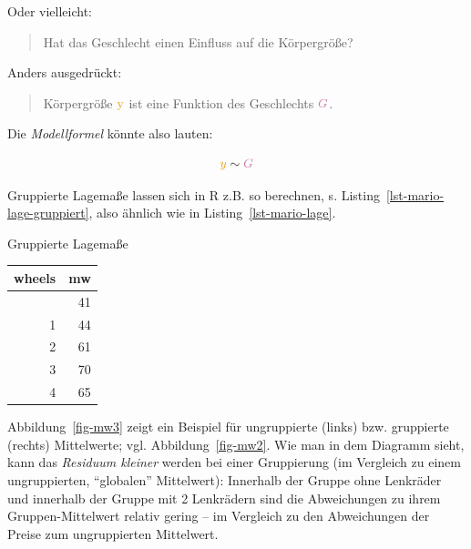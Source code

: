 \documentclass[
  letterpaper,
]{scrbook}
\newenvironment{Shaded}{\begin{snugshade}}{\end{snugshade}}
\newcommand{\AttributeTok}[1]{\textcolor[rgb]{0.40,0.45,0.13}{#1}}
\newcommand{\CommentTok}[1]{\textcolor[rgb]{0.37,0.37,0.37}{#1}}
\newcommand{\FunctionTok}[1]{\textcolor[rgb]{0.28,0.35,0.67}{#1}}
\newcommand{\NormalTok}[1]{\textcolor[rgb]{0.00,0.23,0.31}{#1}}
\newcommand{\OtherTok}[1]{\textcolor[rgb]{0.00,0.23,0.31}{#1}}
\newcommand{\SpecialCharTok}[1]{\textcolor[rgb]{0.37,0.37,0.37}{#1}}
\theoremstyle{definition}
\theoremstyle{definition}
\theoremstyle{definition}
\theoremstyle{remark}
\begin{document}
Oder vielleicht:

\begin{quote}
Hat das Geschlecht einen Einfluss auf die Körpergröße?
\end{quote}

Anders ausgedrückt:

\begin{quote}
Körpergröße \(\color{ycol}{\text{y}}\) ist eine Funktion des Geschlechts
\(\color{xcol}{G}\).
\end{quote}

Die \emph{Modellformel} könnte also lauten:

\[\color{ycol}{y} \; \color{black}{ \sim } \; \color{xcol}{G}\]

Gruppierte Lagemaße lassen sich in R z.B. so berechnen, s.
Listing~\ref{lst-mario-lage-gruppiert}, also ähnlich wie in
Listing~\ref{lst-mario-lage}.

\begin{codelisting}

\caption{\label{lst-mario-lage-gruppiert}Gruppierte Lagemaße}

\centering{

\begin{Shaded}
\begin{Highlighting}[]
\NormalTok{mariokart\_lagemaße\_gruppiert }\OtherTok{\textless{}{-}}
\NormalTok{  mariokart }\SpecialCharTok{\%\textgreater{}\%} 
  \FunctionTok{group\_by}\NormalTok{(wheels) }\SpecialCharTok{\%\textgreater{}\%}  \CommentTok{\# neue Zeile, der Rest ist gleich!}
  \FunctionTok{summarise}\NormalTok{(}\AttributeTok{mw =} \FunctionTok{mean}\NormalTok{(total\_pr))}
\end{Highlighting}
\end{Shaded}

}

\end{codelisting}%

\begin{longtable}[]{@{}rr@{}}
\toprule\noalign{}
wheels & mw \\
\midrule\noalign{}
\endhead
\bottomrule\noalign{}
\endlastfoot
0 & 41 \\
1 & 44 \\
2 & 61 \\
3 & 70 \\
4 & 65 \\
\end{longtable}

Abbildung~\ref{fig-mw3} zeigt ein Beispiel für ungruppierte (links) bzw.
gruppierte (rechts) Mittelwerte; vgl. Abbildung~\ref{fig-mw2}. Wie man
in dem Diagramm sieht, kann das \emph{Residuum kleiner} werden bei einer
Gruppierung (im Vergleich zu einem ungruppierten, \enquote{globalen}
Mittelwert): Innerhalb der Gruppe ohne Lenkräder und innerhalb der
Gruppe mit 2 Lenkrädern sind die Abweichungen zu ihrem
Gruppen-Mittelwert relativ gering -- im Vergleich zu den Abweichungen
der Preise zum ungruppierten Mittelwert.
\end{document}
